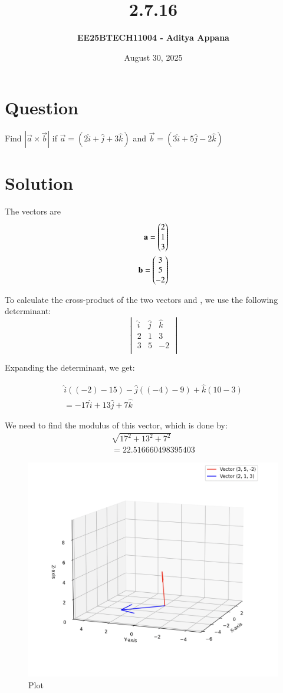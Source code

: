 \documentclass[12pt]{article}
\title{\textbf{2.7.16}}
\author{\textbf{EE25BTECH11004 - Aditya Appana}}
\date{August 30, 2025}
\begin{document}
\maketitle

\section*{Question}
Find $|\vec{a}\times \vec{b}|$ if $\vec{a} = (2\hat{i} +\hat{j} +3\hat{k})$ and  $ \vec{b}=(3\hat{i} + 5\hat{j} - 2\hat{k})$

\section*{Solution}
The vectors are
\begin{align} 
\mathbf{a} = \begin{pmatrix}2\\1\\3\end{pmatrix}\\
\mathbf{b} = \begin{pmatrix}3\\5\\-2\end{pmatrix}
\end{align}

To calculate the cross-product of the two vectors  and , we use the following determinant:\\

\[
\begin{vmatrix}
\hat{i} & \hat{j} & \hat{k}\\
2&1&3\\
3&5&-2\\
\end{vmatrix}
\]
\vspace{1cm}


Expanding the determinant, we get: 

\begin{align}
\hat{i}((-2) - 15) - \hat{j}((-4) - 9) + \hat{k}(10-3)\\
= -17\hat{i} + 13\hat{j} + 7\hat{k}
\end{align}

We need to find the modulus of this vector, which is done by:
\begin{align}
\sqrt{17^2+13^2+7^2} \\
=22.516660498395403
\end{align}

\vspace{0.5cm}


\begin{figure}[H]
    \centering
    \includegraphics[width=0.7\columnwidth]{Figs/Figure_4.png}
    \caption{Plot}
    \label{fig:placeholder}
\end{figure}
\end{document}
